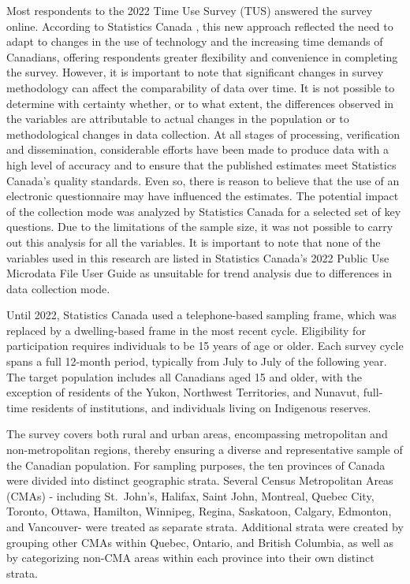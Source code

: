 \documentclass[preprint, 3p,
authoryear]{elsarticle} %
\begin{document}
Most respondents to the 2022 Time Use Survey (TUS) answered the survey
online. According to Statistics Canada
\citeyearpar{statisticscanada2022}, this new approach reflected the need
to adapt to changes in the use of technology and the increasing time
demands of Canadians, offering respondents greater flexibility and
convenience in completing the survey. However, it is important to note
that significant changes in survey methodology can affect the
comparability of data over time. It is not possible to determine with
certainty whether, or to what extent, the differences observed in the
variables are attributable to actual changes in the population or to
methodological changes in data collection. At all stages of processing,
verification and dissemination, considerable efforts have been made to
produce data with a high level of accuracy and to ensure that the
published estimates meet Statistics Canada's quality standards. Even so,
there is reason to believe that the use of an electronic questionnaire
may have influenced the estimates. The potential impact of the
collection mode was analyzed by Statistics Canada for a selected set of
key questions. Due to the limitations of the sample size, it was not
possible to carry out this analysis for all the variables. It is
important to note that none of the variables used in this research are
listed in Statistics Canada's 2022 Public Use Microdata File User Guide
\citep{statisticscanada2022} as unsuitable for trend analysis due to
differences in data collection mode.

Until 2022, Statistics Canada used a telephone-based sampling frame,
which was replaced by a dwelling-based frame in the most recent cycle.
Eligibility for participation requires individuals to be 15 years of age
or older. Each survey cycle spans a full 12-month period, typically from
July to July of the following year. The target population includes all
Canadians aged 15 and older, with the exception of residents of the
Yukon, Northwest Territories, and Nunavut, full-time residents of
institutions, and individuals living on Indigenous reserves.

The survey covers both rural and urban areas, encompassing metropolitan
and non-metropolitan regions, thereby ensuring a diverse and
representative sample of the Canadian population. For sampling purposes,
the ten provinces of Canada were divided into distinct geographic
strata. Several Census Metropolitan Areas (CMAs) - including St.~John's,
Halifax, Saint John, Montreal, Quebec City, Toronto, Ottawa, Hamilton,
Winnipeg, Regina, Saskatoon, Calgary, Edmonton, and Vancouver- were
treated as separate strata. Additional strata were created by grouping
other CMAs within Quebec, Ontario, and British Columbia, as well as by
categorizing non-CMA areas within each province into their own distinct
strata.
\end{document}
